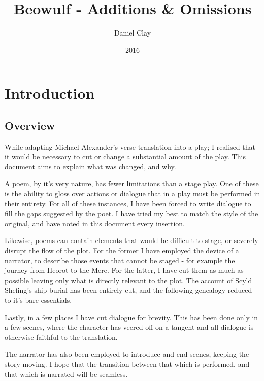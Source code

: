\documentclass[a4paper]{article}
\begin{document}
\title{Beowulf - Additions \& Omissions}
\date{2016}
\author{
Daniel Clay \\ 
}
\maketitle

\section{Introduction}

\subsection{Overview}%

While adapting Michael Alexander's verse translation into a play; I realised that it would 
be necessary to cut or change a substantial amount of the play. This document
aims to explain what was changed, and why. 

A poem, by it's very nature, has fewer limitations than a stage play. One of these
is the ability to gloss over actions or dialogue that in a play must be performed
in their entirety. For all of these instances, I have been forced to write dialogue
to fill the gaps suggested by the poet. I have tried my best to match the style of 
the original, and have noted in this document every insertion.

Likewise, poems can contain elements that would be difficult to stage, or severely
disrupt the flow of the plot. For the former I have employed the device of a narrator,
to describe those events that cannot be staged - for example the journey from Heorot
to the Mere. For the latter, I have cut them as much as possible leaving only what
is directly relevant to the plot. The account of Scyld Shefing's ship burial has been 
entirely cut, and the following genealogy reduced to it's bare essentials.

Lastly, in a few places I have cut dialogue for brevity. This has been done only
in a few scenes, where the character has veered off on a tangent and all dialogue
is otherwise faithful to the translation.

The narrator has also been employed to introduce and end scenes, keeping the
story moving. I hope that the transition between that which is performed, and
that which is narrated will be seamless.
\end{document}
